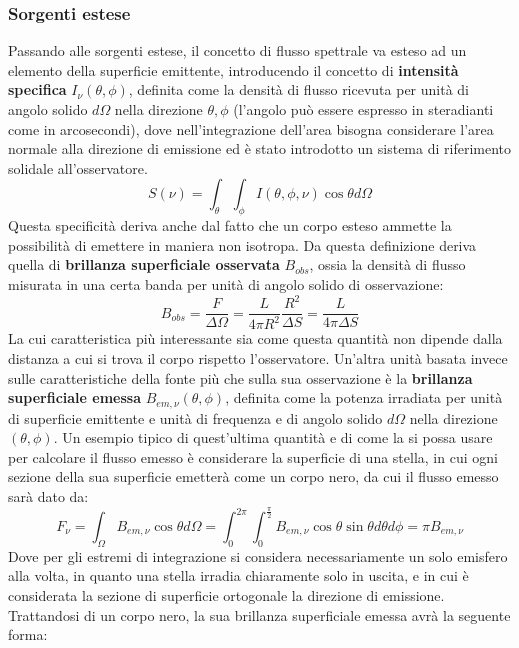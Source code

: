 \documentclass[a4paper,twoside,openany,notitlepage]{book}
\theoremstyle{definition}
\theoremstyle{plain}
\begin{document}
\subsubsection*{Sorgenti estese}
Passando alle sorgenti estese, il concetto di flusso spettrale va esteso ad un elemento della superficie emittente, introducendo il concetto di \textbf{intensità specifica} $I_\nu (\theta,\phi)$, definita come la densità di flusso ricevuta per unità di angolo solido $d\Omega$ nella direzione $\theta,\phi$ (l'angolo può essere espresso in steradianti come in arcosecondi), dove nell'integrazione dell'area bisogna considerare l'area normale alla direzione di emissione ed è stato introdotto un sistema di riferimento solidale all'osservatore.
\begin{equation*}
	S(\nu)=\int_{\theta}^{}\int_{\phi}^{} I(\theta,\phi,\nu)\cos\theta d\Omega
\end{equation*}
Questa specificità deriva anche dal fatto che un corpo esteso ammette la possibilità di emettere in maniera non isotropa. Da questa definizione deriva quella di \textbf{brillanza superficiale osservata} $B_{obs}$, ossia la densità di flusso misurata in una certa banda per unità di angolo solido di osservazione:
\begin{equation*}
	B_{obs} = \frac{F}{\Delta\Omega} = \frac{L}{4\pi R^2}\frac{R^2}{\Delta S} =
	\frac{L}{4\pi\Delta S}
\end{equation*}
La cui caratteristica più interessante sia come questa quantità non dipende dalla distanza a cui si trova il corpo rispetto l'osservatore. Un'altra unità basata invece sulle caratteristiche della fonte più che sulla sua osservazione è la \textbf{brillanza superficiale emessa} $B_{em,\nu}(\theta,\phi)$, definita come la potenza irradiata per unità di superficie emittente e unità di frequenza e di angolo solido $d\Omega$ nella direzione $(\theta,\phi)$. Un esempio tipico di quest'ultima quantità e di come la si possa usare per calcolare il flusso emesso è considerare la superficie di una stella, in cui ogni sezione della sua superficie emetterà come un corpo nero, da cui il flusso emesso sarà dato da:
\begin{equation*}
	F_\nu = \int_{\Omega}^{} B_{em,\nu} \cos\theta d\Omega =
	\int_{0}^{2\pi} \int_{0}^{\frac{\pi}{2}} B_{em,\nu} \cos\theta\sin\theta d\theta d\phi =
	\pi B_{em,\nu}
\end{equation*}
Dove per gli estremi di integrazione si considera necessariamente un solo emisfero alla volta, in quanto una stella irradia chiaramente solo in uscita, e in cui è considerata la sezione di superficie ortogonale la direzione di emissione. Trattandosi di un corpo nero, la sua brillanza superficiale emessa avrà la seguente forma:
\end{document}
